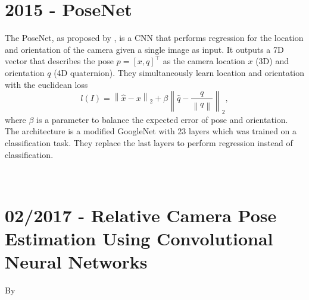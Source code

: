        	\section{2015 - PoseNet}
       		The PoseNet, as proposed by \cite{kendall2015posenet}, is a CNN that performs regression for the location and orientation of the camera given a single image as input.
       		It outputs a 7D vector that describes the pose $p = [x, q]^\top$ as the camera location $x$ (3D) and orientation $q$ (4D quaternion).
       		They simultaneously learn location and orientation with the euclidean loss
       		\begin{equation}
       			l(I) = \left\|
       						\hat{x} - x 
       					\right\|_2 
       					+ \beta 
       					\left\| 
       						\hat{q} - \frac{q}{\left\| q \right\|} 
       					\right\|_2,
       		\end{equation}
       		where $\beta$ is a parameter to balance the expected error of pose and orientation.
       		The architecture is a modified GoogleNet with 23 layers which was trained on a classification task.
       		They replace the last layers to perform regression instead of classification.
       		
       		\\
        
        \section{02/2017 - Relative Camera Pose Estimation Using Convolutional Neural Networks}
        	By \cite{melekhov2017poseCNN}
        	\\
       	
       	
        
        
        